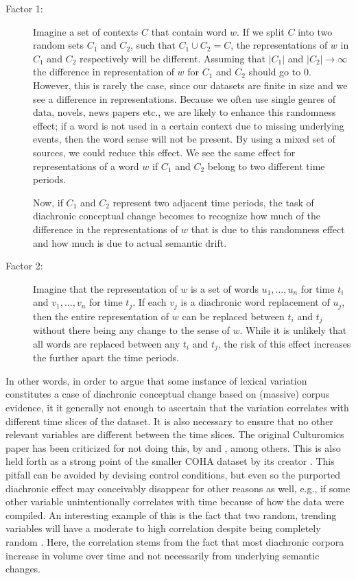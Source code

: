 \documentclass[output=paper]{langsci/langscibook}
\begin{document}
	\begin{description}
	\item[Factor 1:] Imagine a set of contexts $C$ that contain word $w$. If we split $C$ into two random sets $ C_1$  and $C_2$, such that $C_1 \cup C_2 = C$, the representations of $w$ in $C_1$ and $C_2$ respectively will be different. Assuming that $|C_1|$ and $|C_2| \rightarrow \infty$ the difference in representation of $w$ for $C_1$  and $C_2$ should go to 0. However, this is rarely the case, since our datasets are finite in size and we see a difference in representations. Because we often use single genres of data, novels, news papers etc., we are likely to enhance this randomness effect; if a word is not used in a certain context due to missing underlying events, then the word sense will not be present. By using a mixed set of sources, we could reduce this effect. We see the same effect for representations of a word $w$ if $C_1$ and $C_2$ belong to two different time periods. 
		 
     Now, if $ C_1$  and $C_2$ represent two adjacent time periods, the task of diachronic conceptual change becomes to recognize how much of the difference in the representations of $w$  that is due to this randomness effect and how much is due to actual semantic drift. 
	\item[Factor 2:] Imagine that the representation of $w$ is a set of words $u_1, \ldots, u_n$ for time $t_i$ and $v_1,\ldots,v_n$ for time $t_j$. If each $v_j$ is a diachronic word replacement of $u_j$, then the entire representation of $w$ can be replaced between $t_i$ and $t_j$ without there being any change to the sense of $w$. While it is unlikely that all words are replaced between any $t_i$ and $t_j$, the risk of this effect increases the further apart the time periods. 
	\end{description} 

In other words, in order to argue that some instance of lexical variation constitutes
a case of diachronic conceptual change based on (massive) corpus evidence, it it
generally not enough to ascertain that the variation correlates with
different time slices of the dataset. It is also necessary to ensure that no other relevant variables are different between the time
slices. The original Culturomics paper \citep{michel2011quantitative}
has been criticized for not doing this, by \citet{pechenick-etal-2015}
and \citet{koplenig-2017b}, among others. This is also held forth as a
strong point of the smaller COHA dataset by its creator
\citep{davies2012expanding}. This pitfall can be avoided by devising control
conditions, but even so the purported diachronic effect may
conceivably disappear for other reasons as well, e.g.,  if some other
variable unintentionally correlates with time because of how the data
were compiled. An interesting example of this is the fact that two random, trending variables will have a moderate to high correlation despite being completely random \citep{koplenig2016population}. Here, the correlation stems from the fact that most diachronic corpora increase in volume over time and not necessarily from underlying semantic changes.
\end{document}
